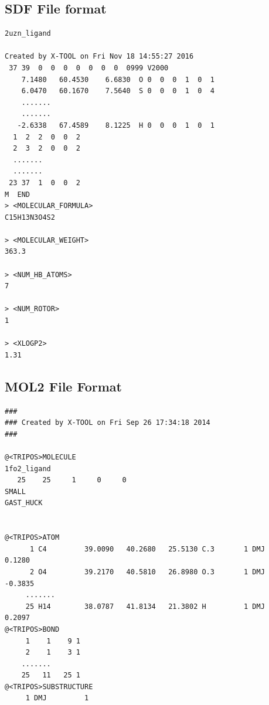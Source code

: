 \documentclass[11pt]{article}
\begin{document}
\subsection{SDF File format}
\label{SDFFileexampleref}
\begin{verbatim}
2uzn_ligand

Created by X-TOOL on Fri Nov 18 14:55:27 2016
 37 39  0  0  0  0  0  0  0  0999 V2000
    7.1480   60.4530    6.6830  O 0  0  0  1  0  1
    6.0470   60.1670    7.5640  S 0  0  0  1  0  4
    .......
    .......
   -2.6338   67.4589    8.1225  H 0  0  0  1  0  1
  1  2  2  0  0  2
  2  3  2  0  0  2
  .......
  .......
 23 37  1  0  0  2
M  END
> <MOLECULAR_FORMULA>
C15H13N3O4S2

> <MOLECULAR_WEIGHT>
363.3

> <NUM_HB_ATOMS>
7  

> <NUM_ROTOR>
1  

> <XLOGP2>
1.31 
\end{verbatim}

\subsection{MOL2 File Format}
\label{MOL2Fileexampleref}
\begin{verbatim}
### 
### Created by X-TOOL on Fri Sep 26 17:34:18 2014
### 

@<TRIPOS>MOLECULE
1fo2_ligand
   25    25     1     0     0
SMALL
GAST_HUCK


@<TRIPOS>ATOM
      1 C4         39.0090   40.2680   25.5130 C.3       1 DMJ         0.1280
      2 O4         39.2170   40.5810   26.8980 O.3       1 DMJ        -0.3835
     .......
     25 H14        38.0787   41.8134   21.3802 H         1 DMJ         0.2097
@<TRIPOS>BOND
     1    1    9 1  
     2    1    3 1  
    .......
    25   11   25 1  
@<TRIPOS>SUBSTRUCTURE
     1 DMJ         1
\end{verbatim}
\end{document}
